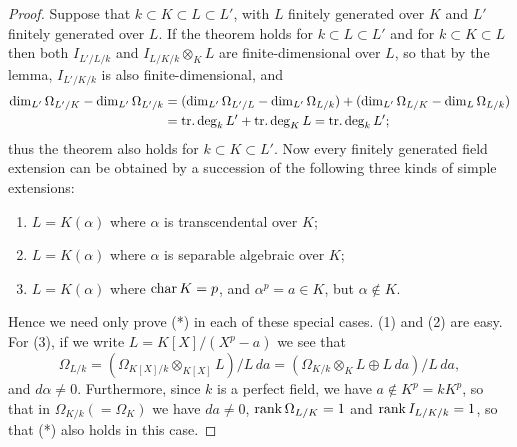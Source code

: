 \begin{proof}
Suppose that $k \subset K \subset L \subset L'$, with $L$ finitely generated over $K$ and $L'$
finitely generated over $L$. If the theorem holds for $k \subset L \subset L'$ and for
$k \subset K \subset L$ then both $I_{L'/L/k}$ and $I_{L/K/k} \otimes_K L$ are finite-dimensional over
$L$, so that by the lemma, $I_{L'/K/k}$ is also finite-dimensional, and
\begin{align*}
  \dim_{L'} \Omega_{L'/K} - \dim_{L'} \Omega_{L'/k}
      &= (\dim_{L'} \Omega_{L'/L} - \dim_{L'} \Omega_{L/k}) +
          (\dim_{L'} \Omega_{L/K} - \dim_L \Omega_{L/k}) \\
      &= \operatorname{tr.deg}_k L' + \operatorname{tr.deg}_K L = \operatorname{tr.deg}_k L';
\end{align*}
thus the theorem also holds for $k \subset K \subset L'$. Now every finitely generated
field extension can be obtained by a succession of the following three kinds of
simple extensions:
\begin{enumerate}[(1)]
  \item $L = K(\alpha)$ where $\alpha$ is transcendental over $K$;
  \item $L = K(\alpha)$ where $\alpha$ is separable algebraic over $K$;
  \item $L = K(\alpha)$ where $\operatorname{char} K = p$, and $\alpha^p = a \in K$, but $\alpha \notin K$.
\end{enumerate}
Hence we need only prove (*) in each of these special cases. (1) and (2) are
easy. For (3), if we write $L = K[X]/(X^p - a)$ we see that
\[
  \Omega_{L/k} = (\Omega_{K[X]/k} \otimes_{K[X]} L)/L\,da
      = (\Omega_{K/k} \otimes_K L \oplus L\,da)/L\,da,
\]
and $d\alpha \ne 0$. Furthermore, since $k$ is a perfect field, we have
$a \notin K^p = kK^p$, so that in $\Omega_{K/k}(= \Omega_K)$ we have $da \ne 0$,
$\operatorname{rank} \Omega_{L/K} = 1$ and $\operatorname{rank} I_{L/K/k} = 1$, so that (*) also holds in this case.
\end{proof}

